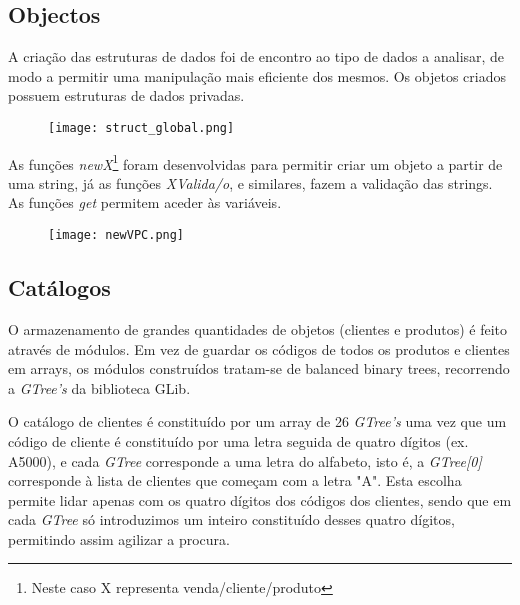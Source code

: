 \documentclass{article}
\newenvironment{mpar}{\par\noindent\minipage{\linewidth}
\setlength{\parindent}{1em}}{\endminipage\par\medskip}
\begin{document}
\subsection{Objectos}\label{sub:obj}


A criação das estruturas de dados foi de encontro ao tipo de dados a analisar, de modo a permitir uma manipulação mais eficiente dos mesmos. Os objetos criados possuem estruturas de dados privadas. 



\begin{figure}[h!]
\centering
\texttt{[image: struct\_global.png]}
\end{figure}


As funções \textit{newX}\footnote[1]{Neste caso X representa venda/cliente/produto} foram desenvolvidas para permitir criar um objeto a partir de uma string, já as funções \textit{XValida/o}, e similares, fazem a validação das strings. As funções \textit{get} permitem aceder às variáveis. 


\begin{figure}[h!]
\centering
\texttt{[image: newVPC.png]}
\end{figure}


\subsection{Catálogos}\label{sub:cat}

O armazenamento de grandes quantidades de objetos (clientes e produtos) é feito através de módulos. Em vez de guardar os códigos de todos os produtos e clientes em arrays, os módulos construídos tratam-se de balanced binary trees, recorrendo a \textit{GTree's} da biblioteca GLib. 

O catálogo de clientes é constituído por um array de 26 \textit{GTree's} uma vez que um código de cliente é constituído por uma letra seguida de quatro dígitos (ex. A5000), e cada \textit{GTree} corresponde a uma letra do alfabeto, isto é, a \textit{GTree[0]} corresponde à lista de clientes que começam com a letra "A". Esta escolha permite lidar apenas com os quatro dígitos dos códigos dos clientes, sendo que em cada \textit{GTree} só introduzimos um inteiro constituído desses quatro dígitos, permitindo assim agilizar a procura.  
\end{document}
